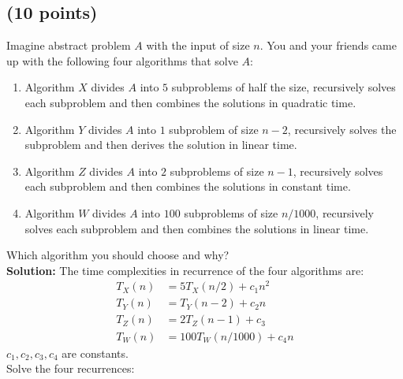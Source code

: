 \documentclass[letterpaper, 11pt]{article}
\begin{document}
\subsection{(10 points)}

Imagine abstract problem $A$ with the input of size $n$.
You and your friends came up with the following four algorithms that solve $A$:
\begin{enumerate}
\item Algorithm $X$ divides $A$ into $5$ subproblems of half the size, recursively solves each subproblem and then combines the solutions in quadratic time. 
\item Algorithm $Y$ divides $A$ into $1$ subproblem of size $n-2$, recursively solves the subproblem and then derives the solution in linear time.
\item Algorithm $Z$ divides $A$ into $2$ subproblems of size $n-1$, recursively solves each subproblem and then combines the solutions in constant time.
\item Algorithm $W$ divides $A$ into $100$ subproblems of size $n/1000$, recursively solves each subproblem and then combines the solutions in linear time.
\end{enumerate}
Which algorithm you should choose and why?\\
\textbf{Solution:} The time complexities in recurrence of the four algorithms are:\\
\begin{align}
    T_X(n) &= 5T_X(n/2)+c_1n^2\\
    T_Y(n) &= T_Y(n-2)+c_2n\\
    T_Z(n) &= 2T_Z(n-1)+c_3\\
    T_W(n) &= 100T_W(n/1000)+c_4n
\end{align}
$c_1, c_2, c_3, c_4$ are constants.\\
Solve the four recurrences:
\end{document}
